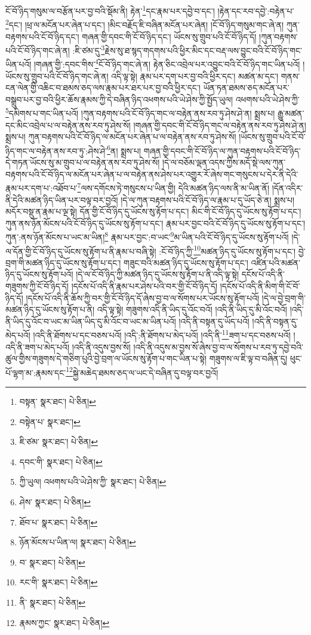 ངོ་བོ་ཉིད་གསུམ་ལ་བརྩོན་པར་བྱ་བའི་སྡོམ་ནི། རྟེན་\footnote{བསྟན་  སྣར་ཐང་།  པེ་ཅིན། }དང་རྣམ་པར་དབྱེ་བ་དང་། །རྟེན་དང་རབ་དབྱེ་:བརྟེན་པ་\footnote{བསྟེན་པ་  སྣར་ཐང་། }དང་། །ཕྲ་ལ་མངོན་པར་ཞེན་པ་དང་། །མིང་བརྗོད་ཇི་བཞིན་མངོན་པར་ཞེན། །ངོ་བོ་ཉིད་གསུམ་གང་ཞེ་ན། ཀུན་བརྟགས་པའི་ངོ་བོ་ཉིད་དང་། གཞན་གྱི་དབང་གི་ངོ་བོ་ཉིད་དང་། ཡོངས་སུ་གྲུབ་པའི་ངོ་བོ་ཉིད་དོ། །ཀུན་བརྟགས་པའི་ངོ་བོ་ཉིད་གང་ཞེ་ན། :ཇི་ཙམ་དུ་\footnote{ཇི་ཙམ་  སྣར་ཐང་།  པེ་ཅིན། }རྗེས་སུ་ཐ་སྙད་གདགས་པའི་ཕྱིར་མིང་དང་བརྡ་ལས་བྱུང་བའི་ངོ་བོ་ཉིད་གང་ཡིན་པའོ། །གཞན་གྱི་:དབང་གིས་\footnote{དབང་གི་  སྣར་ཐང་།  པེ་ཅིན། }ངོ་བོ་ཉིད་གང་ཞེ་ན། རྟེན་ཅིང་འབྲེལ་པར་འབྱུང་བའི་ངོ་བོ་ཉིད་གང་ཡིན་པའོ། །ཡོངས་སུ་གྲུབ་པའི་ངོ་བོ་ཉིད་གང་ཞེ་ན། འདི་ལྟ་སྟེ། རྣམ་པར་དག་པར་བྱ་བའི་ཕྱིར་དང་། མཚན་མ་དང་། གནས་ངན་ལེན་གྱི་འཆིང་བ་ཐམས་ཅད་ལས་རྣམ་པར་ཐར་པར་བྱ་བའི་ཕྱིར་དང་། ཡོན་ཏན་ཐམས་ཅད་མངོན་པར་བསྒྲུབ་པར་བྱ་བའི་ཕྱིར་ཆོས་རྣམས་ཀྱི་དེ་བཞིན་ཉིད་འཕགས་པའི་ཡེ་ཤེས་ཀྱི་སྤྱོད་ཡུལ། འཕགས་པའི་ཡེ་ཤེས་ཀྱི་\footnote{ཀྱི་ཡུལ། འཕགས་པའི་ཡེ་ཤེས་ཀྱི་  སྣར་ཐང་།  པེ་ཅིན། }དམིགས་པ་གང་ཡིན་པའོ། །ཀུན་བརྟགས་པའི་ངོ་བོ་ཉིད་གང་ལ་བརྟེན་ནས་རབ་ཏུ་ཤེས་ཤེ་ན། སྨྲས་པ། རྒྱུ་མཚན་དང་མིང་འབྲེལ་པ་ལ་བརྟེན་ནས་རབ་ཏུ་ཤེས་སོ། །གཞན་གྱི་དབང་གི་ངོ་བོ་ཉིད་གང་ལ་བརྟེན་ནས་རབ་ཏུ་ཤེས་ཤེ་ན། སྨྲས་པ། ཀུན་བརྟགས་པའི་ངོ་བོ་ཉིད་ལ་མངོན་པར་ཞེན་པ་ལ་བརྟེན་ནས་རབ་ཏུ་ཤེས་སོ། །ཡོངས་སུ་གྲུབ་པའི་ངོ་བོ་ཉིད་གང་ལ་བརྟེན་ནས་རབ་ཏུ་:ཤེས་ཤེ་\footnote{ཤེས་  སྣར་ཐང་།  པེ་ཅིན། }ན། སྨྲས་པ། གཞན་གྱི་དབང་གི་ངོ་བོ་ཉིད་ལ་ཀུན་བརྟགས་པའི་ངོ་བོ་ཉིད་དེ་གཏན་ཡོངས་སུ་མ་གྲུབ་པ་ལ་བརྟེན་ནས་རབ་ཏུ་ཤེས་སོ། །དེ་ལ་བཅོམ་ལྡན་འདས་ཀྱིས་མདོ་སྡེ་ལས་ཀུན་བརྟགས་པའི་ངོ་བོ་ཉིད་ལ་མངོན་པར་ཞེན་པ་ལ་བརྟེན་ནས་ཤེས་པར་འགྱུར་རོ་ཞེས་གང་གསུངས་པ་དེར་ནི་དེའི་རྣམ་པར་དག་པ་:འཐོབ་པ་\footnote{ཐོབ་པ་  སྣར་ཐང་།  པེ་ཅིན། }ལས་དགོངས་ཏེ་གསུངས་པ་ཡིན་གྱི། དེའི་མཚན་ཉིད་ལས་ནི་མ་ཡིན་ནོ། །དོན་འདིར་ནི་དེའི་མཚན་ཉིད་ཡིན་པར་བལྟ་བར་བྱའོ། །དེ་ལ་ཀུན་བརྟགས་པའི་ངོ་བོ་ཉིད་ལ་རྣམ་པ་དུ་ཡོད་ཅེ་ན། སྨྲས་པ། མདོར་བསྡུ་ན་རྣམ་པ་ལྔ་སྟེ། དོན་གྱི་ངོ་བོ་ཉིད་དུ་ཡོངས་སུ་རྟོག་པ་དང་། མིང་གི་ངོ་བོ་ཉིད་དུ་ཡོངས་སུ་རྟོག་པ་དང་། ཀུན་ནས་ཉོན་མོངས་པའི་ངོ་བོ་ཉིད་དུ་ཡོངས་སུ་རྟོག་པ་དང་། རྣམ་པར་བྱང་བའི་ངོ་བོ་ཉིད་དུ་ཡོངས་སུ་རྟོག་པ་དང་། ཀུན་:ནས་ཉོན་མོངས་པ་ཡང་མ་ཡིན།\footnote{ཉོན་མོངས་པ་ཡིན་ལ།  སྣར་ཐང་།  པེ་ཅིན། } རྣམ་པར་བྱང་:བ་ཡང་\footnote{བ་  སྣར་ཐང་།  པེ་ཅིན། }མ་ཡིན་པའི་ངོ་བོ་ཉིད་དུ་ཡོངས་སུ་རྟོག་པའོ། །དེ་ལ་དོན་གྱི་ངོ་བོ་ཉིད་དུ་ཡོངས་སུ་རྟོག་པ་ནི་རྣམ་པ་བཞི་སྟེ། :ངོ་བོ་ཉིད་ཀྱི་\footnote{རང་གི་  སྣར་ཐང་།  པེ་ཅིན། }མཚན་ཉིད་དུ་ཡོངས་སུ་རྟོག་པ་དང་། བྱེ་བྲག་གི་མཚན་ཉིད་དུ་ཡོངས་སུ་རྟོག་པ་དང་། གཟུང་བའི་མཚན་ཉིད་དུ་ཡོངས་སུ་རྟོག་པ་དང་། འཛིན་པའི་མཚན་ཉིད་དུ་ཡོངས་སུ་རྟོག་པའོ། །དེ་ལ་ངོ་བོ་ཉིད་ཀྱི་མཚན་ཉིད་དུ་ཡོངས་སུ་རྟོག་པ་ནི་འདི་ལྟ་སྟེ། དངོས་པོ་འདི་ནི་གཟུགས་ཀྱི་ངོ་བོ་ཉིད་དོ། །དངོས་པོ་འདི་ནི་རྣམ་པར་ཤེས་པའི་བར་གྱི་ངོ་བོ་ཉིད་དོ། །དངོས་པོ་འདི་ནི་མིག་གི་ངོ་བོ་ཉིད་དོ། །དངོས་པོ་འདི་ནི་ཆོས་ཀྱི་བར་གྱི་ངོ་བོ་ཉིད་དོ་ཞེས་བྱ་བ་ལ་སོགས་པར་ཡོངས་སུ་རྟོག་པའོ། །དེ་ལ་བྱེ་བྲག་གི་མཚན་ཉིད་དུ་ཡོངས་སུ་རྟོག་པ་ནི། འདི་ལྟ་སྟེ། གཟུགས་འདི་ནི་ཡིད་དུ་འོང་བའོ། །འདི་ནི་ཡིད་དུ་མི་འོང་བའོ། །འདི་ནི་ཡིད་དུ་འོང་བ་ཡང་མ་ཡིན་ཡིད་དུ་མི་འོང་བ་ཡང་མ་ཡིན་པའོ། །འདི་ནི་བསྟན་དུ་ཡོད་པའོ། །འདི་ནི་བསྟན་དུ་མེད་པའོ། །འདི་ནི་ཐོགས་པ་དང་བཅས་པའོ། །འདི་:ནི་ཐོགས་པ་མེད་པའོ། །འདི་ནི་\footnote{ནི་  སྣར་ཐང་།  པེ་ཅིན། }ཟག་པ་དང་བཅས་པའོ། །འདི་ནི་ཟག་པ་མེད་པའོ། །འདི་ནི་འདུས་བྱས་སོ། །འདི་ནི་འདུས་མ་བྱས་སོ་ཞེས་བྱ་བ་ལ་སོགས་པ་རབ་ཏུ་དབྱེ་བའི་ཚུལ་གྱིས་གཟུགས་དེ་གཅིག་པུའི་བྱེ་བྲག་ལ་ཡོངས་སུ་རྟོག་པ་གང་ཡིན་པ་སྟེ། གཟུགས་ལ་ཇི་ལྟ་བ་བཞིན་དུ། ཕུང་པོ་ལྷག་མ་:རྣམས་དང་\footnote{རྣམས་ཀྱང་  སྣར་ཐང་།  པེ་ཅིན། }སྐྱེ་མཆེད་ཐམས་ཅད་ལ་ཡང་དེ་བཞིན་དུ་བལྟ་བར་བྱའོ། 